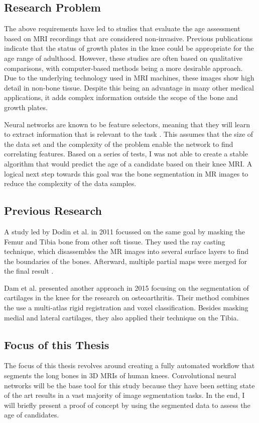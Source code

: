 \subsection{Research Problem}

The above requirements have led to studies that evaluate the age assessment based on MRI recordings that are considered non-invasive. Previous publications \cite{Saring2014}\cite{Jopp2007} indicate that the status of growth plates in the knee could be appropriate for the age range of adulthood. However, these studies are often based on qualitative comparisons, with computer-based methods being a more desirable approach. Due to the underlying technology used in MRI machines, these images show high detail in non-bone tissue. Despite this being an advantage in many other medical applications, it adds complex information outside the scope of the bone and growth plates.

Neural networks are known to be feature selectors, meaning that they will learn to extract information that is relevant to the task \cite{Setiono1997}. This assumes that the size of the data set and the complexity of the problem enable the network to find correlating features. Based on a series of tests, I was not able to create a stable algorithm that would predict the age of a candidate based on their knee MRI. A logical next step towards this goal was the bone segmentation in MR images to reduce the complexity of the data samples.

\subsection{Previous Research}

A study led by Dodin et al. in 2011 focussed on the same goal by masking the Femur and Tibia bone from other soft tissue. They used the ray casting technique, which disassembles the MR images into several surface layers to find the boundaries of the bones. Afterward, multiple partial maps were merged for the final result \cite{Dodin2011}.

Dam et al. presented another approach in 2015 focusing on the segmentation of cartilages in the knee for the research on osteoarthritis. Their method combines the use a multi-atlas rigid registration and voxel classification. Besides masking medial and lateral cartilages, they also applied their technique on the Tibia.

\subsection{Focus of this Thesis}

The focus of this thesis revolves around creating a fully automated workflow that segments the long bones in 3D MRIs of human knees. Convolutional neural networks will be the base tool for this study because they have been setting state of the art results in a vast majority of image segmentation tasks. In the end, I will briefly present a proof of concept by using the segmented data to assess the age of candidates.

\newpage
